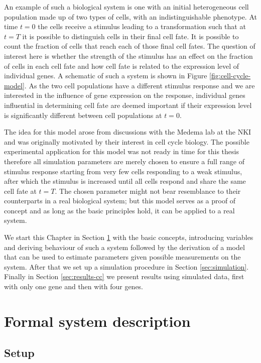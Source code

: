 An example of such a biological system is one with an initial heterogeneous cell population made up of two types of cells, with an indistinguishable phenotype. At time $t=0$ the cells receive a stimulus leading to a transformation such that at $t=T$ it is possible to distinguish cells in their final cell fate. It is possible to count the fraction of cells that reach each of those final cell fates. The question of interest here is whether the strength of the stimulus has an effect on the fraction of cells in each cell fate and how cell fate is related to the expression level of individual genes. A schematic of such a system is shown in Figure \ref{fig:cell-cycle-model}. As the two cell populations have a different stimulus response and we are interested in the influence of gene expression on the response, individual genes influential in determining cell fate are deemed important if their expression level is significantly different between cell populations at $t=0$.

The idea for this model arose from discussions with the Medema lab at the NKI and was originally motivated by their interest in cell cycle biology. The possible experimental application for this model was not ready in time for this thesis therefore all simulation parameters are merely chosen to ensure a full range of stimulus response starting from very few cells responding to a weak stimulus, after which the stimulus is increased until all cells respond and share the same cell fate at $t=T$. The chosen parameter might not bear resemblance to their counterparts in a real biological system; but this model serves as a proof of concept and as long as the basic principles hold, it can be applied to a real system.

We start this Chapter in Section \ref{sec:model-descr} with the basic concepts, introducing variables and deriving  behaviour of such a system followed by the derivation of a model that can be used to estimate parameters given possible measurements on the system. After that we set up a simulation procedure in Section \ref{sec:simulation}. Finally in Section \ref{sec:results-cc} we present results using simulated data, first with only one gene and then with four genes.

\section{Formal system description}
\label{sec:model-descr}

\subsection{Setup}
\label{sec:concepts}

